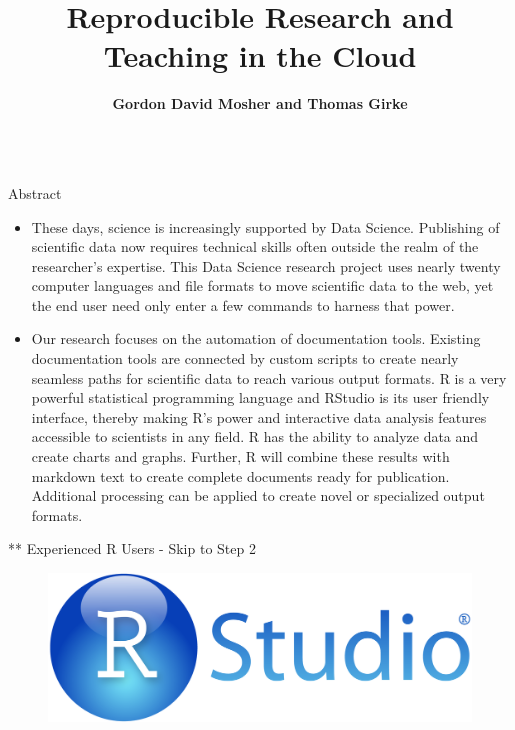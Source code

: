 \documentclass[final]{beamer}
\title{Reproducible Research and Teaching in the Cloud}
\author{\bf Gordon David Mosher and Thomas Girke}
\institute{\bf University of California, Riverside - Departments of Statistics and Bioinformatics}
\begin{document}

\begin{frame}[fragile]
\vspace{-2ex}
\begin{columns}[t]


\begin{column}{0.31\linewidth}
\begin{minipage}[t][1.000\textheight]{\linewidth} 

\vspace{0ex}
\begin{block}{Abstract}
\begin{itemize}
\item These days, science is increasingly supported by Data Science. Publishing of scientific data now requires technical skills often outside the realm of the researcher's expertise. This Data Science research project uses nearly twenty computer languages and file formats to move scientific data to the web, yet the end user need only enter a few commands to harness that power.
\item Our research focuses on the automation of documentation tools. Existing documentation tools are connected by custom scripts to create nearly seamless paths for scientific data to reach various output formats. R is a very powerful statistical programming language and RStudio is its user friendly interface, thereby making R's power and interactive data analysis features accessible to scientists in any field. R has the ability to analyze data and create charts and graphs. Further, R will combine these results with markdown text to create complete documents ready for publication. Additional processing can be applied to create novel or specialized output formats.
\end{itemize}
\vspace{0ex}
\end{block}
\vfill

\begin{block}{** Experienced R Users - Skip to Step 2}
\begin{figure}
\includegraphics[width=0.50\linewidth]{images/RStudio-Logo-Blue-Gradient.png}
\end{figure}
\vspace{0ex}
\vfill
\end{block}
\vfill


\end{minipage}
\end{column}
\end{columns}
\end{frame}
\end{document}
